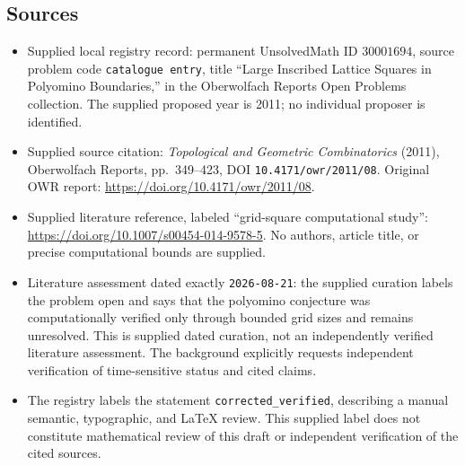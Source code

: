 \documentclass[11pt]{article}
\begin{document}
\subsection{Sources}
\begin{itemize}
\item Supplied local registry record: permanent UnsolvedMath ID \(30001694\), source problem code \texttt{catalogue entry}, title ``Large Inscribed Lattice Squares in Polyomino Boundaries,'' in the Oberwolfach Reports Open Problems collection. The supplied proposed year is 2011; no individual proposer is identified.
\item Supplied source citation: \emph{Topological and Geometric Combinatorics} (2011), Oberwolfach Reports, pp.~349--423, DOI \texttt{10.4171/owr/2011/08}. Original OWR report: \url{https://doi.org/10.4171/owr/2011/08}.
\item Supplied literature reference, labeled ``grid-square computational study'': \url{https://doi.org/10.1007/s00454-014-9578-5}. No authors, article title, or precise computational bounds are supplied.
\item Literature assessment dated exactly \texttt{2026-08-21}: the supplied curation labels the problem open and says that the polyomino conjecture was computationally verified only through bounded grid sizes and remains unresolved. This is supplied dated curation, not an independently verified literature assessment. The background explicitly requests independent verification of time-sensitive status and cited claims.
\item The registry labels the statement \texttt{corrected\_verified}, describing a manual semantic, typographic, and LaTeX review. This supplied label does not constitute mathematical review of this draft or independent verification of the cited sources.
\end{itemize}
\end{document}
